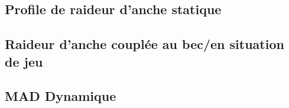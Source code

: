 
\subsection{Profile de raideur d'anche statique}


\subsection{Raideur d'anche couplée au bec/en situation de jeu}

\subsection{MAD Dynamique}

